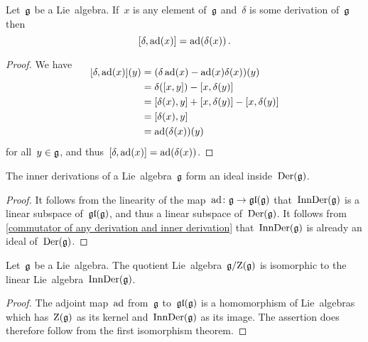 \begin{lemma}
  \label{commutator of any derivation and inner derivation}
  Let~$\mathfrak{g}$ be a Lie~algebra.
  If~$x$ is any element of~$\mathfrak{g}$ and~$\delta$ is some derivation of~$\mathfrak{g}$ then
  \[
    [\delta, \operatorname{ad}(x)] = \operatorname{ad}(\delta(x)) \,.
  \]
\end{lemma}


\begin{proof}
  We have
  \begin{align*}
    \SwapAboveDisplaySkip
    [\delta, \ad(x)](y)
    &= 
    (\delta \ad(x) - \ad(x) \delta(x))(y)
    \\
    &=
    \delta([x,y]) - [x,\delta(y)]
    \\
    &=
    [\delta(x),y] + [x,\delta(y)] - [x,\delta(y)]
    \\
    &=
    [\delta(x),y]
    \\
    &=
    \ad(\delta(x))(y)
  \end{align*}
  for all~$y \in \mathfrak{g}$, and thus~$[\delta, \operatorname{ad}(x)] = \operatorname{ad}(\delta(x))$.
\end{proof}


\begin{corollary}
  \label{inner derivations are an ideal}
  The inner derivations of a Lie~algebra~$\mathfrak{g}$ form an ideal inside~$\operatorname{Der}(\mathfrak{g})$.
\end{corollary}


\begin{proof}
  It follows from the linearity of the map~$\ad \colon \glie \to \gllie(\glie)$ that~$\operatorname{InnDer}(\mathfrak{g})$ is a linear subspace of~$\mathfrak{gl}(\mathfrak{g})$, and thus a linear subspace of~$\operatorname{Der}(\mathfrak{g})$.
  It follows from \cref{commutator of any derivation and inner derivation} that~$\operatorname{InnDer}(\mathfrak{g})$ is already an ideal of~$\operatorname{Der}(\mathfrak{g})$. 
\end{proof}


\begin{proposition}
  Let~$\mathfrak{g}$ be a Lie~algebra.
  The quotient Lie~algebra~$\mathfrak{g}/{\operatorname{Z}(\mathfrak{g})}$ is isomorphic to the linear Lie~algebra~$\operatorname{InnDer}(\mathfrak{g})$.
\end{proposition}


\begin{proof}
  The adjoint map~$\operatorname{ad}$ from~$\mathfrak{g}$ to~$\mathfrak{gl}(\mathfrak{g})$ is a homomorphism of Lie~algebras which has~$\operatorname{Z}(\mathfrak{g})$ as its kernel and~$\operatorname{InnDer}(\mathfrak{g})$ as its image.
  The assertion does therefore follow from the first isomorphism theorem.
\end{proof}


